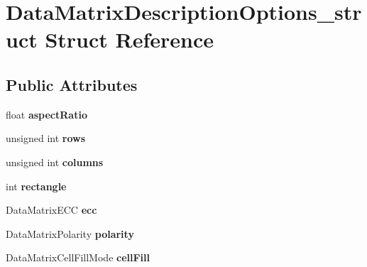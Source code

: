 \hypertarget{structDataMatrixDescriptionOptions__struct}{
\section{DataMatrixDescriptionOptions\_\-struct Struct Reference}
\label{structDataMatrixDescriptionOptions__struct}
}
\subsection*{Public Attributes}
\begin{DoxyCompactItemize}
\item 
\hypertarget{structDataMatrixDescriptionOptions__struct_a70658854727be9580c564ab8c9844aeb}{
float {\bfseries aspectRatio}}
\label{structDataMatrixDescriptionOptions__struct_a70658854727be9580c564ab8c9844aeb}

\item 
\hypertarget{structDataMatrixDescriptionOptions__struct_a11cccb0ff80a8c3f74ed314a2851e0cc}{
unsigned int {\bfseries rows}}
\label{structDataMatrixDescriptionOptions__struct_a11cccb0ff80a8c3f74ed314a2851e0cc}

\item 
\hypertarget{structDataMatrixDescriptionOptions__struct_a2ee3281044b90e2faa3caf841a821cba}{
unsigned int {\bfseries columns}}
\label{structDataMatrixDescriptionOptions__struct_a2ee3281044b90e2faa3caf841a821cba}

\item 
\hypertarget{structDataMatrixDescriptionOptions__struct_a686669d886d99d331cf6909372372d72}{
int {\bfseries rectangle}}
\label{structDataMatrixDescriptionOptions__struct_a686669d886d99d331cf6909372372d72}

\item 
\hypertarget{structDataMatrixDescriptionOptions__struct_a27cbda68c4f8f6d9be0ba437a6b47fdd}{
DataMatrixECC {\bfseries ecc}}
\label{structDataMatrixDescriptionOptions__struct_a27cbda68c4f8f6d9be0ba437a6b47fdd}

\item 
\hypertarget{structDataMatrixDescriptionOptions__struct_a91bdd70d8b68f76db45cfac61b256b6a}{
DataMatrixPolarity {\bfseries polarity}}
\label{structDataMatrixDescriptionOptions__struct_a91bdd70d8b68f76db45cfac61b256b6a}

\item 
\hypertarget{structDataMatrixDescriptionOptions__struct_aa77217422c077e542e99dcd3d422c9dd}{
DataMatrixCellFillMode {\bfseries cellFill}}
\label{structDataMatrixDescriptionOptions__struct_aa77217422c077e542e99dcd3d422c9dd}


\end{DoxyCompactItemize}
